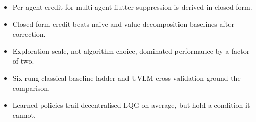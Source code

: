 \documentclass[11pt]{article}
\begin{document}
\begin{itemize}
\item Per-agent credit for multi-agent flutter suppression is derived in closed form.
\item Closed-form credit beats naive and value-decomposition baselines after correction.
\item Exploration scale, not algorithm choice, dominated performance by a factor of two.
\item Six-rung classical baseline ladder and UVLM cross-validation ground the comparison.
\item Learned policies trail decentralised LQG on average, but hold a condition it cannot.
\end{itemize}
\end{document}

